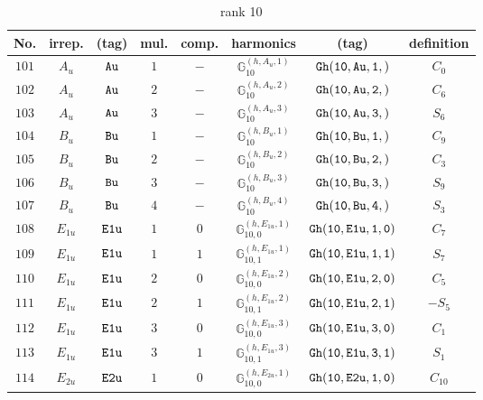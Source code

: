 \documentclass[fleqn,8pt]{jsarticle}
\begin{document}
\begin{table}[ht!]
\begin{center}
\caption{rank 10}
\renewcommand{\arraystretch}{1.3}
\begin{tabular}{cccccccc} \hline \hline
No. & irrep. & (tag) & mul. & comp. & harmonics & (tag) & definition \\ \hline
$ 101 $ & $ A_{u} $ & $ {\tt Au} $ & $ 1 $ & $ - $ & $ \mathbb{G}_{10}^{(h,A_{u},1)} $ & $ {\tt Gh(10,Au,1,)} $ & $ C_{0} $ \\
$ 102 $ & $ A_{u} $ & $ {\tt Au} $ & $ 2 $ & $ - $ & $ \mathbb{G}_{10}^{(h,A_{u},2)} $ & $ {\tt Gh(10,Au,2,)} $ & $ C_{6} $ \\
$ 103 $ & $ A_{u} $ & $ {\tt Au} $ & $ 3 $ & $ - $ & $ \mathbb{G}_{10}^{(h,A_{u},3)} $ & $ {\tt Gh(10,Au,3,)} $ & $ S_{6} $ \\
$ 104 $ & $ B_{u} $ & $ {\tt Bu} $ & $ 1 $ & $ - $ & $ \mathbb{G}_{10}^{(h,B_{u},1)} $ & $ {\tt Gh(10,Bu,1,)} $ & $ C_{9} $ \\
$ 105 $ & $ B_{u} $ & $ {\tt Bu} $ & $ 2 $ & $ - $ & $ \mathbb{G}_{10}^{(h,B_{u},2)} $ & $ {\tt Gh(10,Bu,2,)} $ & $ C_{3} $ \\
$ 106 $ & $ B_{u} $ & $ {\tt Bu} $ & $ 3 $ & $ - $ & $ \mathbb{G}_{10}^{(h,B_{u},3)} $ & $ {\tt Gh(10,Bu,3,)} $ & $ S_{9} $ \\
$ 107 $ & $ B_{u} $ & $ {\tt Bu} $ & $ 4 $ & $ - $ & $ \mathbb{G}_{10}^{(h,B_{u},4)} $ & $ {\tt Gh(10,Bu,4,)} $ & $ S_{3} $ \\
$ 108 $ & $ E_{1u} $ & $ {\tt E1u} $ & $ 1 $ & $ 0 $ & $ \mathbb{G}_{10,0}^{(h,E_{1u},1)} $ & $ {\tt Gh(10,E1u,1,0)} $ & $ C_{7} $ \\
$ 109 $ & $ E_{1u} $ & $ {\tt E1u} $ & $ 1 $ & $ 1 $ & $ \mathbb{G}_{10,1}^{(h,E_{1u},1)} $ & $ {\tt Gh(10,E1u,1,1)} $ & $ S_{7} $ \\
$ 110 $ & $ E_{1u} $ & $ {\tt E1u} $ & $ 2 $ & $ 0 $ & $ \mathbb{G}_{10,0}^{(h,E_{1u},2)} $ & $ {\tt Gh(10,E1u,2,0)} $ & $ C_{5} $ \\
$ 111 $ & $ E_{1u} $ & $ {\tt E1u} $ & $ 2 $ & $ 1 $ & $ \mathbb{G}_{10,1}^{(h,E_{1u},2)} $ & $ {\tt Gh(10,E1u,2,1)} $ & $ - S_{5} $ \\
$ 112 $ & $ E_{1u} $ & $ {\tt E1u} $ & $ 3 $ & $ 0 $ & $ \mathbb{G}_{10,0}^{(h,E_{1u},3)} $ & $ {\tt Gh(10,E1u,3,0)} $ & $ C_{1} $ \\
$ 113 $ & $ E_{1u} $ & $ {\tt E1u} $ & $ 3 $ & $ 1 $ & $ \mathbb{G}_{10,1}^{(h,E_{1u},3)} $ & $ {\tt Gh(10,E1u,3,1)} $ & $ S_{1} $ \\
$ 114 $ & $ E_{2u} $ & $ {\tt E2u} $ & $ 1 $ & $ 0 $ & $ \mathbb{G}_{10,0}^{(h,E_{2u},1)} $ & $ {\tt Gh(10,E2u,1,0)} $ & $ C_{10} $ \\

\end{tabular}
\end{center}
\end{table}
\end{document}
